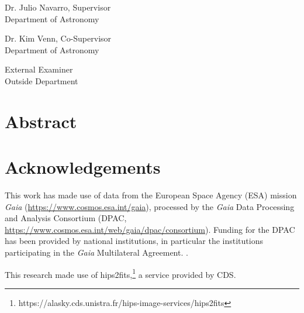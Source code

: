 \documentclass[12pt,oneside,letterpaper]{report}
\newcommand{\skipline}{\vspace{\baselineskip}}
\begin{document}
Dr. Julio Navarro, Supervisor\\
Department of Astronomy \\
\skipline

\noindent Dr. Kim Venn, Co-Supervisor\\
Department of Astronomy\\

\skipline

\noindent External Examiner \\
Outside Department

\chapter*{Abstract}


\chapter*{Acknowledgements}




This work has made use of data from the European Space Agency (ESA) mission
{\it Gaia} (\url{https://www.cosmos.esa.int/gaia}), processed by the {\it Gaia}
Data Processing and Analysis Consortium (DPAC,
\url{https://www.cosmos.esa.int/web/gaia/dpac/consortium}). Funding for the DPAC
has been provided by national institutions, in particular the institutions
participating in the {\it Gaia} Multilateral Agreement. 
\citep{gaiacollaboration+2016, gaiacollaboration+2023}.


This research made use of hips2fits,\footnote{https://alasky.cds.unistra.fr/hips-image-services/hips2fits} a service provided by CDS.





\tableofcontents
\listoffigures
\listoftables

%
%
%
%
%
%
%
%
\newpage
\end{document}
